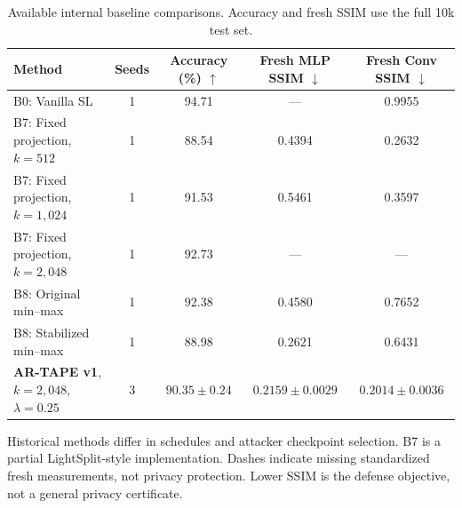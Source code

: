 \begin{table}[t]
\centering
\caption{Available internal baseline comparisons. Accuracy and fresh SSIM use the full 10k test set.}
\label{tab:baselines}
\footnotesize
\setlength{\tabcolsep}{4pt}
\begin{tabular}{@{}lcccc@{}}
\toprule
Method & Seeds & Accuracy (\%) $\uparrow$ & Fresh MLP SSIM $\downarrow$ & Fresh Conv SSIM $\downarrow$ \\
\midrule
B0: Vanilla SL & 1 & 94.71 & --- & 0.9955 \\
B7: Fixed projection, $k=512$ & 1 & 88.54 & 0.4394 & 0.2632 \\
B7: Fixed projection, $k=1{,}024$ & 1 & 91.53 & 0.5461 & 0.3597 \\
B7: Fixed projection, $k=2{,}048$ & 1 & 92.73 & --- & --- \\
B8: Original min--max & 1 & 92.38 & 0.4580 & 0.7652 \\
B8: Stabilized min--max & 1 & 88.98 & 0.2621 & 0.6431 \\
\textbf{AR-TAPE v1}, $k=2{,}048$, $\lambda=0.25$ & 3 & $90.35\pm 0.24$ & $0.2159\pm 0.0029$ & $0.2014\pm 0.0036$ \\
\bottomrule
\end{tabular}
\par\vspace{2pt}\begin{minipage}{\linewidth}\footnotesize Historical methods differ in schedules and attacker checkpoint selection. B7 is a partial LightSplit-style implementation. Dashes indicate missing standardized fresh measurements, not privacy protection. Lower SSIM is the defense objective, not a general privacy certificate.\end{minipage}
\end{table}
